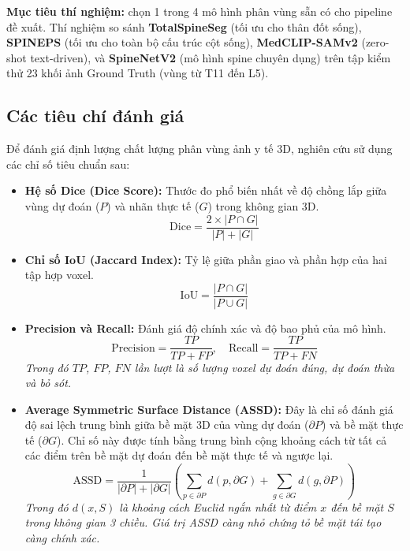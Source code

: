 \textbf{Mục tiêu thí nghiệm:} chọn 1 trong 4 mô hình phân vùng sẵn có cho pipeline đề xuất. Thí nghiệm so sánh \textbf{TotalSpineSeg} (tối ưu cho thân đốt sống), \textbf{SPINEPS} (tối ưu cho toàn bộ cấu trúc cột sống), \textbf{MedCLIP-SAMv2} (zero-shot text-driven), và \textbf{SpineNetV2} (mô hình spine chuyên dụng) trên tập kiểm thử 23 khối ảnh Ground Truth (vùng từ T11 đến L5).

\subsection{Các tiêu chí đánh giá}
Để đánh giá định lượng chất lượng phân vùng ảnh y tế 3D, nghiên cứu sử dụng các chỉ số tiêu chuẩn sau:

\begin{itemize}
    \item \textbf{Hệ số Dice (Dice Score):} 
    Thước đo phổ biến nhất về độ chồng lắp giữa vùng dự đoán ($P$) và nhãn thực tế ($G$) trong không gian 3D.
    \begin{equation}
        \text{Dice} = \frac{2 \times |P \cap G|}{|P| + |G|}
    \end{equation}

    \item \textbf{Chỉ số IoU (Jaccard Index):}
    Tỷ lệ giữa phần giao và phần hợp của hai tập hợp voxel.
    \begin{equation}
        \text{IoU} = \frac{|P \cap G|}{|P \cup G|}
    \end{equation}

    \item \textbf{Precision và Recall:}
    Đánh giá độ chính xác và độ bao phủ của mô hình.
    \begin{equation}
        \text{Precision} = \frac{TP}{TP + FP}, \quad \text{Recall} = \frac{TP}{TP + FN}
    \end{equation}
    \textit{Trong đó $TP$, $FP$, $FN$ lần lượt là số lượng voxel dự đoán đúng, dự đoán thừa và bỏ sót.}

    \item \textbf{Average Symmetric Surface Distance (ASSD):}
    Đây là chỉ số đánh giá độ sai lệch trung bình giữa bề mặt 3D của vùng dự đoán ($\partial P$) và bề mặt thực tế ($\partial G$). Chỉ số này được tính bằng trung bình cộng khoảng cách từ tất cả các điểm trên bề mặt dự đoán đến bề mặt thực tế và ngược lại.
    \begin{equation}
        \text{ASSD} = \frac{1}{|\partial P| + |\partial G|} \left( \sum_{p \in \partial P} d(p, \partial G) + \sum_{g \in \partial G} d(g, \partial P) \right)
    \end{equation}
    \textit{Trong đó $d(x, S)$ là khoảng cách Euclid ngắn nhất từ điểm $x$ đến bề mặt $S$ trong không gian 3 chiều. Giá trị ASSD càng nhỏ chứng tỏ bề mặt tái tạo càng chính xác.}
\end{itemize}

